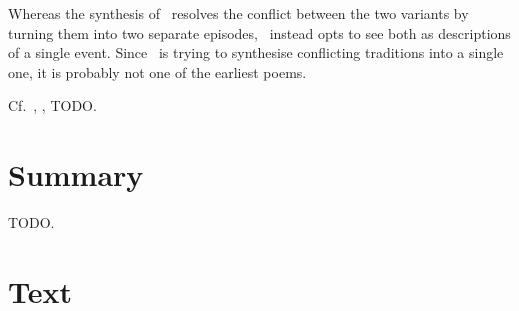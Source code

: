 Whereas the synthesis of \VolsungaSaga\ resolves the conflict between the two variants by turning them into two separate episodes, \Helreid\ instead opts to see both as descriptions of a single event.  Since \Helreid\ is trying to synthesise conflicting traditions into a single one, it is probably not one of the earliest poems.

Cf.~, , TODO.

\section{Summary}

TODO.

\sectionline

\newpage

\section{Text}

